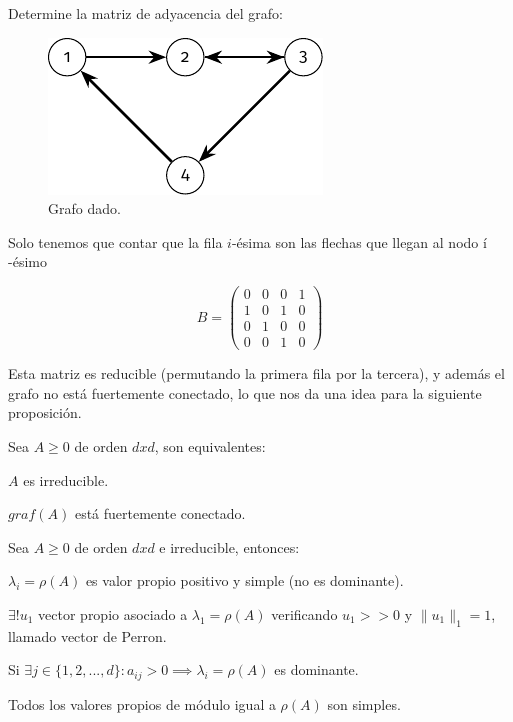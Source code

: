\begin{ejemplo}
Determine la matriz de adyacencia del grafo:
\begin{figure}[H]
	\caption{Grafo dado.}
	\centering \includegraphics{img/grafo_2.pdf}
\end{figure}

Solo tenemos que contar que la fila $i$-ésima son las flechas que llegan al nodo $í$-ésimo

$$ B =
\begin{pmatrix}
0 & 0 & 0 & 1 \\
1 & 0 & 1 & 0 \\
0 & 1 & 0 & 0 \\
0 & 0 & 1 & 0
\end{pmatrix}
$$

\begin{ejemplo}
Esta matriz es reducible (permutando la primera fila por la tercera), y además el grafo no está fuertemente conectado, lo que nos da una idea para la siguiente proposición.
\end{ejemplo}
\end{ejemplo}

\begin{nprop}
Sea $A\geq0$ de orden $dxd$, son equivalentes:
\begin{nlist}
\item $A$ es irreducible.
\item $graf(A)$ está fuertemente conectado.
\end{nlist}
\end{nprop}

\begin{nth}
Sea $A\geq0$ de orden $dxd$ e irreducible, entonces:
\begin{nlist}
\item $\lambda_{i}=\rho(A)$ es valor propio positivo y simple (no es dominante).
\item $\exists!u_{1}$ vector propio asociado a $\lambda_{1}=\rho(A)$ verificando $u_{1} >> 0$ y $\|u_{1}\|_{1}=1$, llamado vector de Perron.
\item Si $\exists j\in\{1,2,...,d\} : a_{ij} > 0 \implies \lambda_{i}=\rho(A)$ es dominante.
\item Todos los valores propios de módulo igual a $\rho(A)$ son simples.
\end{nlist}
\end{nth}

